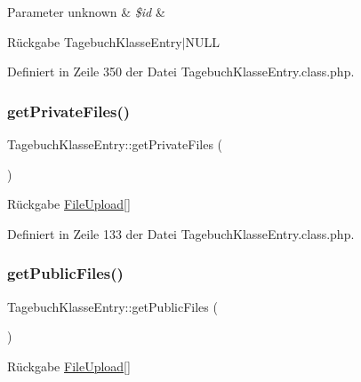 \begin{DoxyParams}[1]{Parameter}
unknown & {\em \$id} & \\
\hline
\end{DoxyParams}
\begin{DoxyReturn}{Rückgabe}
Tagebuch\+Klasse\+Entry$\vert$\+N\+U\+LL 
\end{DoxyReturn}


Definiert in Zeile 350 der Datei Tagebuch\+Klasse\+Entry.\+class.\+php.

\mbox{\label{class_tagebuch_klasse_entry_a69ff3b936456f7743bdc1fda8ae59571}} 
\subsubsection{\texorpdfstring{get\+Private\+Files()}{getPrivateFiles()}}
{\footnotesize\ttfamily Tagebuch\+Klasse\+Entry\+::get\+Private\+Files (\begin{DoxyParamCaption}{ }\end{DoxyParamCaption})}

\begin{DoxyReturn}{Rückgabe}
\mbox{\hyperlink{class_file_upload}{File\+Upload}}\mbox{[}\mbox{]} 
\end{DoxyReturn}


Definiert in Zeile 133 der Datei Tagebuch\+Klasse\+Entry.\+class.\+php.

\mbox{\label{class_tagebuch_klasse_entry_a49ec40403eaf3ebde246c2f9a31d9a60}} 
\subsubsection{\texorpdfstring{get\+Public\+Files()}{getPublicFiles()}}
{\footnotesize\ttfamily Tagebuch\+Klasse\+Entry\+::get\+Public\+Files (\begin{DoxyParamCaption}{ }\end{DoxyParamCaption})}

\begin{DoxyReturn}{Rückgabe}
\mbox{\hyperlink{class_file_upload}{File\+Upload}}\mbox{[}\mbox{]} 
\end{DoxyReturn}


